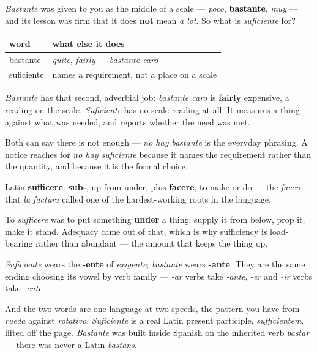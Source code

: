\begin{grammarlens}[title={Grammar Lens: bastante already means this, and that is the problem}]
\emph{Bastante} was given to you as the middle of a scale — \emph{poco}, \textbf{bastante}, \emph{muy} — and its lesson was firm that it does \textbf{not} mean \emph{a lot}. So what is \emph{suficiente} for?

\noindent
\begin{tabularx}{\linewidth}{@{}>{\raggedright\arraybackslash}X>{\raggedright\arraybackslash}X@{}}
\toprule
\textbf{word} & \textbf{what else it does} \\
\midrule
bastante & \emph{quite}, \emph{fairly} — \emph{bastante caro} \\
suficiente & names a requirement, not a place on a scale \\
\bottomrule
\end{tabularx}

\emph{Bastante} has that second, adverbial job: \emph{bastante caro} is \textbf{fairly} expensive, a reading on the scale. \emph{Suficiente} has no scale reading at all. It measures a thing against what was needed, and reports whether the need was met.

Both can say there is not enough — \emph{no hay bastante} is the everyday phrasing. A notice reaches for \emph{no hay suficiente} because it names the requirement rather than the quantity, and because it is the formal choice.
\end{grammarlens}

\begin{cousinweb}
Latin \textbf{sufficere}: \textbf{sub-}, up from under, plus \textbf{facere}, to make or do — the \emph{facere} that \emph{la factura} called one of the hardest-working roots in the language.

To \emph{sufficere} was to put something \textbf{under} a thing: supply it from below, prop it, make it stand. Adequacy came out of that, which is why sufficiency is load-bearing rather than abundant — the amount that keeps the thing up.

\emph{Suficiente} wears the \textbf{-ente} of \emph{exigente}; \emph{bastante} wears \textbf{-ante}. They are the same ending choosing its vowel by verb family — \emph{-ar} verbs take \emph{-ante}, \emph{-er} and \emph{-ir} verbs take \emph{-ente}.

And the two words are one language at two speeds, the pattern you have from \emph{rueda} against \emph{rotativo}. \emph{Suficiente} is a real Latin present participle, \emph{sufficientem}, lifted off the page. \emph{Bastante} was built inside Spanish on the inherited verb \emph{bastar} — there was never a Latin \emph{bastans}.
\end{cousinweb}


